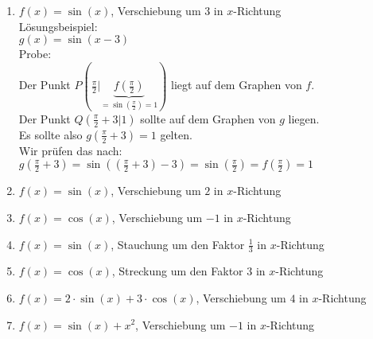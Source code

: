 \documentclass[11pt]{article}
\begin{document}
\begin{enumerate}[label=(\alph*)]
\item $f(x)=\sin(x)$, Verschiebung um $3$ in $x$-Richtung \\
L\"osungsbeispiel: \\
$g(x)=\sin(x-3)$ \\
Probe: \\
Der Punkt $P( \frac{\pi}{2} | \underbrace{ f\left( \frac{\pi}{2} \right) }_{ = \sin\left( \frac{\pi}{2} \right) = 1  })$ liegt auf dem Graphen von $f$. \\
Der Punkt $Q\left( \frac{\pi}{2} + 3 |  1 \right)$ sollte auf dem Graphen von $g$ liegen. \\
Es sollte also $g\left( \frac{\pi}{2} + 3 \right) =  1 $ gelten. \\
Wir pr\"ufen das nach: \\
$g\left( \frac{\pi}{2} + 3 \right) = \sin\left( \left( \frac{\pi}{2} + 3 \right) - 3 \right) = \sin\left( \frac{\pi}{2} \right) = f\left( \frac{\pi}{2} \right) = 1  $
\item $f(x)= \sin(x)$, Verschiebung um $2$ in $x$-Richtung
\item $f(x) = \cos(x)$, Verschiebung um $-1$ in $x$-Richtung
\item $f(x)= \sin(x)$, Stauchung um den Faktor $\frac{1}{3}$ in $x$-Richtung
\item $f(x) = \cos(x)$, Streckung um den Faktor $3$ in $x$-Richtung
\item $f(x) = 2 \cdot \sin(x) + 3 \cdot \cos(x) $, Verschiebung um $4$ in $x$-Richtung
\item $f(x) = \sin(x) + x^2$, Verschiebung um $-1$ in $x$-Richtung
\end{enumerate}
\end{document}
